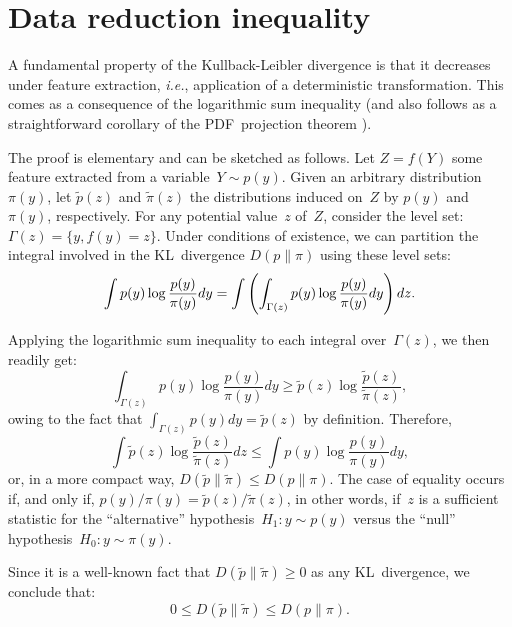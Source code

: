 \documentclass[english]{scrartcl}
\begin{document}


\section{Data reduction inequality}
\label{appendix:reduction_inequality}

A fundamental property of the Kullback-Leibler divergence is that it decreases under feature extraction, {\em i.e.}, application of a deterministic transformation. This comes as a consequence of the logarithmic sum inequality \cite{Cover-06} (and also follows as a straightforward corollary of the PDF~projection theorem \cite{Minka-04,Baggenstoss-15}). 

The proof is elementary and can be sketched as follows. Let $Z=f(Y)$ some feature extracted from a variable~$Y\sim p(y)$. Given an arbitrary distribution~$\pi(y)$, let  $\tilde{p}(z)$ and $\tilde{\pi}(z)$ the distributions induced on~$Z$ by $p(y)$ and $\pi(y)$, respectively. For any potential value~$z$ of~$Z$, consider the level set: $\Gamma(z)=\{y, f(y)=z\}$. Under conditions of existence, we can partition the integral involved in the KL~divergence $D(p\|\pi)$ using these level sets: 
$$
\int p(y) \log \frac{p(y)}{\pi(y)} dy
=
\int \left( \int_{\Gamma(z)} p(y) \log \frac{p(y)}{\pi(y)} dy \right) dz\\
.
$$

Applying the logarithmic sum inequality \cite{Cover-06} to each integral over~$\Gamma(z)$, we then readily get:
$$
\int_{\Gamma(z)} p(y) \log \frac{p(y)}{\pi(y)} dy
\geq 
\tilde{p}(z) \log \frac{\tilde{p}(z)}{\tilde{\pi}(z)}
,
$$
owing to the fact that $\displaystyle \int_{\Gamma(z)} p(y) dy = \tilde{p}(z)$ by definition. Therefore,
$$
\int \tilde{p}(z) \log \frac{\tilde{p}(z)}{\tilde{\pi}(z)} dz
\leq 
\int p(y) \log \frac{p(y)}{\pi(y)} dy
,
$$
or, in a more compact way, $D(\tilde{p}\|\tilde{\pi})\leq D(p\|\pi)$. The case of equality occurs if, and only if, $p(y)/\pi(y)=\tilde{p}(z)/\tilde{\pi}(z)$, in other words, if~$z$ is a sufficient statistic for the ``alternative'' hypothesis~$H_1:y\sim p(y)$ versus the ``null'' hypothesis~$H_0:y\sim\pi(y)$. 

Since it is a well-known fact that $D(\tilde{p}\|\tilde{\pi})\geq 0$ as any KL~divergence, we conclude that:
\begin{equation}
\label{eq:reduction_inequality}
0 
\leq D(\tilde{p}\|\tilde{\pi}) 
\leq D(p\|\pi)
.
\end{equation}
\end{document}
